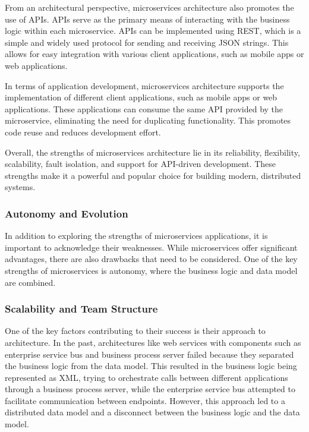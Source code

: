 From an architectural perspective, microservices architecture also
promotes the use of APIs. APIs serve as the primary means of interacting
with the business logic within each microservice. APIs can be
implemented using REST, which is a simple and widely used protocol for
sending and receiving JSON strings. This allows for easy integration
with various client applications, such as mobile apps or web
applications.

In terms of application development, microservices architecture supports
the implementation of different client applications, such as mobile apps
or web applications. These applications can consume the same API
provided by the microservice, eliminating the need for duplicating
functionality. This promotes code reuse and reduces development effort.

Overall, the strengths of microservices architecture lie in its
reliability, flexibility, scalability, fault isolation, and support for
API-driven development. These strengths make it a powerful and popular
choice for building modern, distributed systems.

\subsubsection{Autonomy and Evolution}

In addition to exploring the strengths of microservices applications, it
is important to acknowledge their weaknesses. While microservices offer
significant advantages, there are also drawbacks that need to be
considered. One of the key strengths of microservices is autonomy, where
the business logic and data model are combined.

\subsubsection{Scalability and Team Structure}

One of the key factors contributing to their success is their approach
to architecture. In the past, architectures like web services with
components such as enterprise service bus and business process server
failed because they separated the business logic from the data model.
This resulted in the business logic being represented as XML, trying to
orchestrate calls between different applications through a business
process server, while the enterprise service bus attempted to facilitate
communication between endpoints. However, this approach led to a
distributed data model and a disconnect between the business logic and
the data model.


